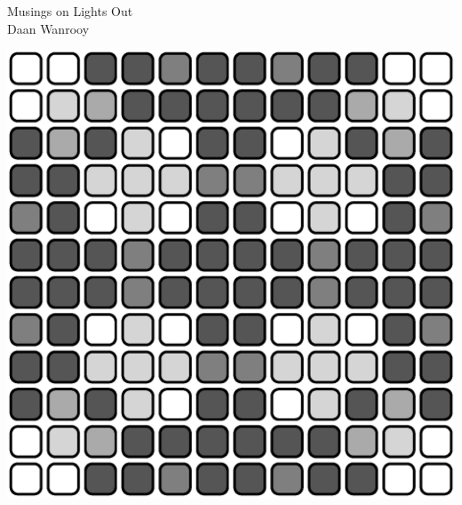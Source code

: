 \thispagestyle{empty}

\begin{center}
	\vspace*{\fill}
	
	{\Huge Musings on Lights Out\\}
	{\Large Daan Wanrooy\\}
	
	\vspace*{\fill}
	
	\includegraphics[width=2\linewidth/3]{image/cover.ps}
	
	\vspace*{\fill}
\end{center}
